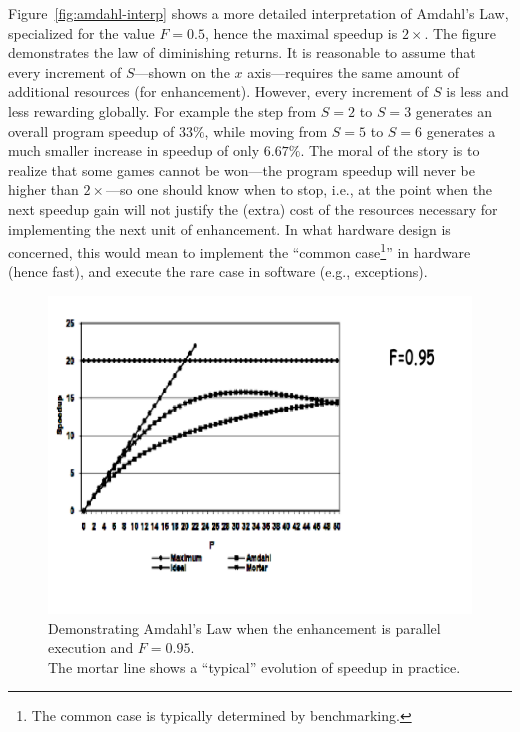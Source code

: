 \documentclass[acmsmall,review]{acmart}\settopmatter{printfolios=true,printccs=false,printacmref=false}
\begin{document}
Figure~\ref{fig:amdahl-interp} shows a more detailed interpretation
of Amdahl's Law, specialized for the value $F = 0.5$, hence the maximal
speedup is $2\times$.   The figure demonstrates the law of diminishing
returns. It is reasonable to assume that every increment of $S$---shown
on the $x$ axis---requires the same amount of additional resources
(for enhancement). However, every increment of $S$ is less and less
rewarding globally. For example the step from $S=2$ to $S=3$ generates
an overall program speedup of $33\%$, while moving from $S=5$ to
$S=6$ generates a much smaller increase in speedup of only $6.67\%$. 
The moral of the story is to realize that some games cannot be 
won---the program speedup will never be higher than $2\times$---so
one should know when to stop, i.e., at the point when the next 
speedup gain will not justify the (extra) cost of the resources
necessary for implementing the next unit of enhancement.
In what hardware design is concerned, this would mean to implement
the ``common case\footnote{The common case is typically determined
by benchmarking.}'' in hardware (hence fast), and execute the rare
case in software (e.g., exceptions). 

\begin{figure}
\vspace{-4ex}
\includegraphics[width=90ex]{Figures/L2/AmdahlPar}\vspace{-7ex}
\caption{Demonstrating Amdahl's Law when the enhancement is 
parallel execution and $F=0.95$.\\ The mortar line shows a ``typical'' 
evolution of speedup in practice.}\vspace{-2ex}
\label{fig:amdahl-parallel}
\end{figure}
\end{document}
